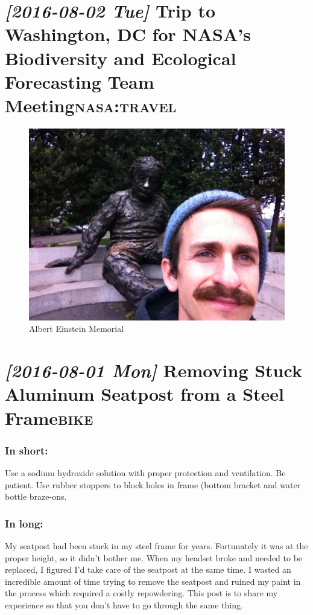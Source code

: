 \documentclass{article}
\begin{document}
\section*{\textit{[2016-08-02 Tue] } Trip to Washington, DC for NASA's Biodiversity and Ecological Forecasting Team Meeting\hfill{}\textsc{nasa:travel}}
\label{sec:org414f2c6}
\begin{figure}[htbp]
\centering
\includegraphics[width=.9\linewidth]{blog_imgs/DC_NASA_meeting/with_einstein.jpg}
\caption{Albert Einstein Memorial}
\end{figure}

\section*{\textit{[2016-08-01 Mon] } Removing Stuck Aluminum Seatpost from a Steel Frame\hfill{}\textsc{bike}}
\label{sec:org7e6a653}

\subsubsection*{In short:}
\label{sec:org2f5dfd5}
Use a sodium hydroxide solution with proper protection and
ventilation. Be patient.  Use rubber stoppers to block holes in frame (bottom bracket
and water bottle braze-ons.

\subsubsection*{In long:}
\label{sec:org3d53b2a}
My seatpost had been stuck in my steel frame for years.  Fortunately
it was at the proper height, so it didn't bother me.  When my headset
broke and needed to be replaced, I figured I'd take care of the
seatpost at the same time.  I wasted an incredible amount of time
trying to remove the seatpost and ruined my paint in the process which
required a costly repowdering.  This post is to share my experience so
that you don't have to go through the same thing.
\end{document}

